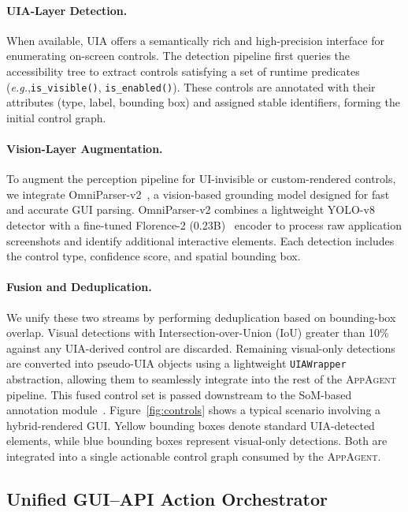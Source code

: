 \documentclass[sigplan,10pt]{acmart}
\newcommand{\appa}{\textsc{AppAgent}\xspace}
\newcommand{\eg}{\textit{e.g.},\xspace}
\begin{document}
\paragraph{UIA-Layer Detection.}
When available, UIA offers a semantically rich and high-precision interface for enumerating on-screen controls. The detection pipeline first queries the accessibility tree to extract controls satisfying a set of runtime predicates (\eg \texttt{is\_visible()}, \texttt{is\_enabled()}). These controls are annotated with their attributes (type, label, bounding box) and assigned stable identifiers, forming the initial control graph.



\paragraph{Vision-Layer Augmentation.}
To augment the perception pipeline for UI-invisible or custom-rendered controls, we integrate OmniParser-v2~\cite{lu2024omniparser}, a vision-based grounding model designed for fast and accurate GUI parsing. OmniParser-v2 combines a lightweight YOLO-v8~\cite{reis2023real} detector with a fine-tuned Florence-2 (0.23B)~\cite{xiao2024florence} encoder to process raw application screenshots and identify additional interactive elements. Each detection includes the control type, confidence score, and spatial bounding box.

\paragraph{Fusion and Deduplication.}
We unify these two streams by performing deduplication based on bounding-box overlap. Visual detections with Intersection-over-Union (IoU) greater than 10\% against any UIA-derived control are discarded. Remaining visual-only detections are converted into pseudo-UIA objects using a lightweight \texttt{UIAWrapper} abstraction, allowing them to seamlessly integrate into the rest of the \appa pipeline. This fused control set is passed downstream to the SoM-based annotation module~\cite{yang2023set}. Figure~\ref{fig:controls} shows a typical scenario involving a hybrid-rendered GUI. Yellow bounding boxes denote standard UIA-detected elements, while blue bounding boxes represent visual-only detections. Both are integrated into a single actionable control graph consumed by the \appa.



\subsection{Unified GUI--API Action Orchestrator}
\label{sec:api}
\end{document}

